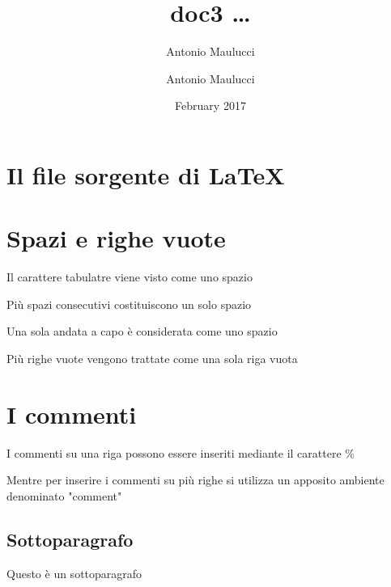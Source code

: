 \documentclass[a4paper]{article}
\title{doc3 \dots} %
\author{Antonio Maulucci \and Antonio Maulucci} %
\date{February 2017}
\begin{document}
%
%
\maketitle

\section{Il file sorgente di \LaTeX}

\section{Spazi e righe vuote}

Il carattere tabulatre viene visto come uno spazio

Più spazi consecutivi costituiscono un solo spazio

Una sola andata a capo è considerata come uno spazio

Più righe vuote vengono trattate come una sola riga vuota

\section{I commenti}

I commenti su una riga possono essere inseriti mediante il carattere $\%$

Mentre per inserire i commenti su più righe si utilizza un apposito ambiente denominato "comment"

\subsection{Sottoparagrafo}

Questo è un sottoparagrafo

\begin{comment}

questo
è
un
commento
su
più righe

\end{comment}

\end{document}
